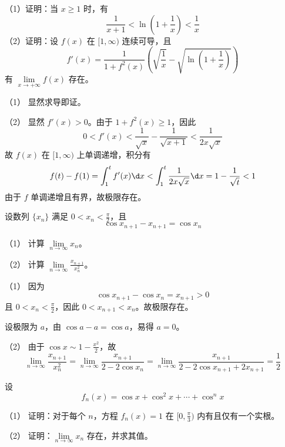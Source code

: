 \begin{problem}[000018]
（1）证明：当 $x \geqslant 1$ 时，有
\[ \frac{1}{x+1} < \ln\left(1 + \frac{1}{x}\right) < \frac{1}{x} \]
（2）证明：设 $f(x)$ 在 $[1, \infty)$ 连续可导，且
\[ f'(x) = \frac{1}{1 + f^2(x)} \left( \sqrt{\frac{1}{x}} - \sqrt{\ln\left(1 + \frac{1}{x}\right)} \right) \]
有 $\lim\limits_{x \to +\infty} f(x)$ 存在。
\end{problem}

\begin{solution}
	（1） 显然求导即证。

	（2） 显然 $f'(x) > 0$。由于 $1 + f^2(x) \geqslant 1$，因此
	\[ 0 < f'(x) < \frac{1}{\sqrt{x}} - \frac{1}{\sqrt{x+1}} < \frac{1}{2 x \sqrt{x}} \]
	故 $f(x)$ 在 $[1, \infty)$ 上单调递增，积分有
	\[ f(t) - f(1) = \int_{1}^{t} f'(x) \d x < \int_{1}^{t} \frac{1}{2 x \sqrt{x}} \d x = 1 - \frac{1}{\sqrt{t}} < 1 \]
	由于 $f$ 单调递增且有界，故极限存在。
\end{solution}

\begin{problem}[000019]
设数列 $\{x_n\}$ 满足 $0 < x_n < \frac{\pi}{2}$，且
\[ \cos x_{n+1} - x_{n+1} = \cos x_n \]

（1） 计算 $\lim\limits_{n \to \infty} x_n$。

（2） 计算 $\lim\limits_{n \to \infty} \frac{x_{n+1}}{x_n^2}$。

\end{problem}

\begin{solution}
	（1） 因为
	\[ \cos x_{n+1} - \cos x_n = x_{n+1} > 0 \]
	且 $0 < x_n < \frac{\pi}{2}$，因此 $0 < x_{n+1} < x_n$。故极限存在。

	设极限为 $a$，由 $\cos a - a = \cos a$，易得 $a = 0$。

	（2） 由于 $\cos x \sim 1 - \frac{x^2}{2}$，故
	\[ \lim_{n \to \infty} \frac{x_{n+1}}{x_n^2} = \lim_{n \to \infty} \frac{x_{n+1}}{2 - 2 \cos x_{n}} = \lim_{n \to \infty} \frac{x_{n+1}}{2 - 2 \cos x_{n+1} + 2x_{n+1}} = \frac{1}{2} \]
\end{solution}

\begin{problem}[000020]
设
\[ f_n(x) = \cos x + \cos^2 x + \cdots + \cos^n x \]

（1） 证明：对于每个 $n$，方程 $f_n(x) = 1$ 在 $[0, \frac{\pi}{3})$ 内有且仅有一个实根。

（2） 证明：$\lim\limits_{n \to \infty} x_n$ 存在，并求其值。
\end{problem}

